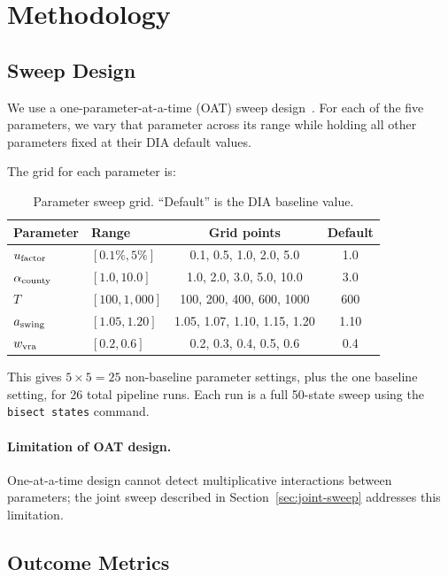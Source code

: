 \section{Methodology}
\label{sec:methodology}

\subsection{Sweep Design}

We use a one-parameter-at-a-time (OAT) sweep design~\citep{morris1991}.
For each of the five parameters, we vary that parameter across its range
while holding all other parameters fixed at their DIA default values.

The grid for each parameter is:

\begin{table}[h]
\centering
\caption{Parameter sweep grid. ``Default'' is the DIA baseline value.}
\label{tab:sweep-grid}
\begin{tabular}{llcc}
\toprule
Parameter & Range & Grid points & Default \\
\midrule
$u_{\mathrm{factor}}$ & $[0.1\%, 5\%]$ & 0.1, 0.5, 1.0, 2.0, 5.0 & 1.0 \\
$\alpha_{\mathrm{county}}$ & $[1.0, 10.0]$ & 1.0, 2.0, 3.0, 5.0, 10.0 & 3.0 \\
$T$ & $[100, 1{,}000]$ & 100, 200, 400, 600, 1000 & 600 \\
$a_{\mathrm{swing}}$ & $[1.05, 1.20]$ & 1.05, 1.07, 1.10, 1.15, 1.20 & 1.10 \\
$w_{\mathrm{vra}}$ & $[0.2, 0.6]$ & 0.2, 0.3, 0.4, 0.5, 0.6 & 0.4 \\
\bottomrule
\end{tabular}
\end{table}

This gives $5 \times 5 = 25$ non-baseline parameter settings,
plus the one baseline setting, for 26 total pipeline runs.
Each run is a full 50-state sweep using the \texttt{bisect states}
command.

\paragraph{Limitation of OAT design.}
One-at-a-time design cannot detect multiplicative interactions between
parameters; the joint sweep described in Section~\ref{sec:joint-sweep}
addresses this limitation.

\subsection{Outcome Metrics}

